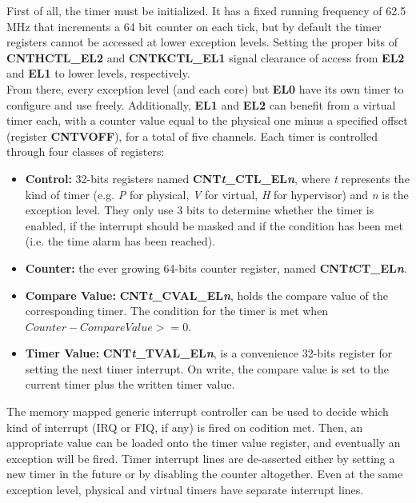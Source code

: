 \documentclass[12pt,a4paper,openright,twoside]{report}
\begin{document}
First of all, the timer must be initialized. It has a fixed running frequency
of 62.5 MHz that increments a 64 bit counter on each tick, but by default the 
timer registers cannot be accessed at lower 
exception levels. Setting the proper bits of \textbf{CNTHCTL\_EL2} 
and \textbf{CNTKCTL\_EL1} signal clearance of access from \textbf{EL2} 
and \textbf{EL1} to lower levels, respectively.\\

From there, every exception level (and each core) but \textbf{EL0} have its own timer to configure
and use freely. Additionally, \textbf{EL1} and \textbf{EL2} can benefit from a
virtual timer each, with a counter value equal to the physical one minus a 
specified offset (register \textbf{CNTVOFF}), for a total of five channels.
Each timer is controlled through four classes of registers:
\begin{itemize}
    \item \textbf{Control:} 32-bits registers named 
        \textbf{CNT\textit{t}\_CTL\_EL\textit{n}}, where \textit{t} represents the
        kind of timer (e.g. \textit{P} for physical, \textit{V} for virtual, 
        \textit{H} for hypervisor) and
        \textit{n} is the exception level. They only use 3 bits to determine whether
        the timer is enabled, if the interrupt should be masked and if the condition
        has been met (i.e. the time alarm has been reached).
    \item \textbf{Counter:} the ever growing 64-bits counter register, 
        named \textbf{CNT\textit{t}CT\_EL\textit{n}}.
    \item \textbf{Compare Value:} \textbf{CNT\textit{t}\_CVAL\_EL\textit{n}}, holds
        the compare value of the corresponding timer. The condition for the timer
        is met when $Counter - CompareValue >= 0$.
    \item \textbf{Timer Value:} \textbf{CNT\textit{t}\_TVAL\_EL\textit{n}}, is a
        convenience 32-bits register for setting the next timer interrupt. On write,
        the compare value is set to the current timer plus the written timer value.
\end{itemize}

The memory mapped generic interrupt controller can be used to decide which kind 
of interrupt (IRQ or FIQ, if any) is fired on codition met. Then, an appropriate
value can be loaded onto the timer value register, and eventually an exception will
be fired. Timer interrupt lines are de-asserted either by setting a new timer
in the future or by disabling the counter altogether.
Even at the same exception level, physical and virtual timers have separate interrupt 
lines.
\end{document}
